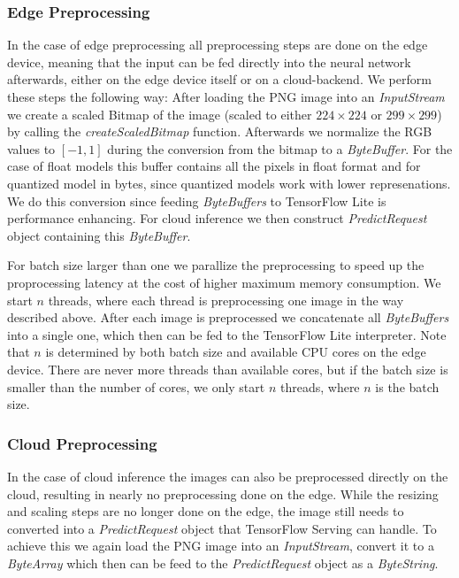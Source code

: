 \subsubsection{Edge Preprocessing}
\label{chap:preproImpl}
In the case of edge preprocessing all preprocessing steps are done on the edge device, meaning that the input can be fed directly into the neural network afterwards, either on the edge device itself or on a cloud-backend.
We perform these steps the following way: After loading the PNG image into an \emph{InputStream} we create a scaled Bitmap of the image (scaled to either $224\times224$ or $299\times299$) by calling the \emph{createScaledBitmap} function. 
Afterwards we normalize the RGB values to $[-1,1]$ during the conversion from the bitmap to a \emph{ByteBuffer}. 
For the case of float models this buffer contains all the pixels in float format and for quantized model in bytes, since quantized models work with lower represenations.
We do this conversion since feeding \emph{ByteBuffers} to TensorFlow Lite is performance enhancing. %
For cloud inference we then construct \emph{PredictRequest} object containing this \emph{ByteBuffer}.

For batch size larger than one we parallize the preprocessing to speed up the proprocessing latency at the cost of higher maximum memory consumption. We start $n$ threads, where each thread is preprocessing one image in the way described above. After each image is preprocessed we concatenate all \emph{ByteBuffers} into a single one, which then can be fed to the TensorFlow Lite interpreter. Note that $n$ is determined by both batch size and available CPU cores on the edge device. There are never more threads than available cores, but if the batch size is smaller than the number of cores, we only start $n$ threads, where $n$ is the batch size. 

\subsubsection{Cloud Preprocessing}

In the case of cloud inference the images can also be preprocessed directly on the cloud, resulting in nearly no preprocessing done on the edge. While the resizing and scaling steps are no longer done on the edge, the image still needs to converted into a \emph{PredictRequest} object that TensorFlow Serving can handle.
To achieve this we again load the PNG image into an \emph{InputStream}, convert it to a \emph{ByteArray} which then can be feed to the \emph{PredictRequest} object as a \emph{ByteString}. 

